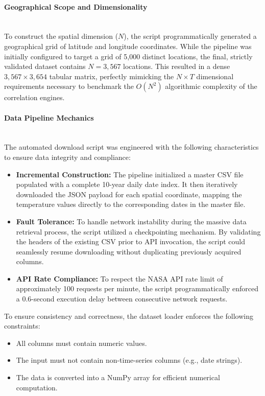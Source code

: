 \paragraph{Geographical Scope and Dimensionality} \mbox{} \\
To construct the spatial dimension ($N$), the script programmatically generated a geographical grid of latitude and longitude coordinates. While the pipeline was initially configured to target a grid of 5,000 distinct locations, the final, strictly validated dataset contains $N = 3,567$ locations. This resulted in a dense $3,567 \times 3,654$ tabular matrix, perfectly mimicking the $N \times T$ dimensional requirements necessary to benchmark the $O(N^2)$ algorithmic complexity of the correlation engines.

\paragraph{Data Pipeline Mechanics} \mbox{} \\
The automated download script was engineered with the following characteristics to ensure data integrity and compliance:
\begin{itemize}
    \item \textbf{Incremental Construction:} The pipeline initialized a master CSV file populated with a complete 10-year daily date index. It then iteratively downloaded the JSON payload for each spatial coordinate, mapping the temperature values directly to the corresponding dates in the master file.
    \item \textbf{Fault Tolerance:} To handle network instability during the massive data retrieval process, the script utilized a checkpointing mechanism. By validating the headers of the existing CSV prior to API invocation, the script could seamlessly resume downloading without duplicating previously acquired columns.
    \item \textbf{API Rate Compliance:} To respect the NASA API rate limit of approximately 100 requests per minute, the script programmatically enforced a 0.6-second execution delay between consecutive network requests.
\end{itemize}

To ensure consistency and correctness, the dataset loader enforces the following constraints:

\begin{itemize}
    \item All columns must contain numeric values.
    \item The input must not contain non-time-series columns (e.g., date strings).
    \item The data is converted into a NumPy array for efficient numerical computation.
\end{itemize}

